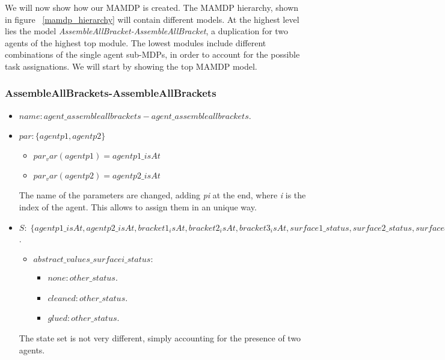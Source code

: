 We will now show how our MAMDP is created. The MAMDP hierarchy, shown in figure ~\ref{mamdp_hierarchy} will contain different models. At the highest level lies the model \textit{AssembleAllBracket-AssembleAllBracket}, a duplication for two agents of the highest top module. The lowest modules include different combinations of the single agent sub-MDPs, in order to account for the possible task assignations. We will start by showing the top MAMDP model.

\subsubsection{AssembleAllBrackets-AssembleAllBrackets}
\begin{itemize}
	\item $name: agent\_assembleallbrackets-agent\_assembleallbrackets$.
	\item		$par: \{agentp1,agentp2\}$
		\begin{itemize}
			\item $par_var(agentp1)=agentp1\_isAt$
			\item $par_var(agentp2)=agentp2\_isAt$
		\end{itemize}

		The name of the parameters are changed, adding \textit{pi} at the end, where \textit{i} is the index of the agent. This allows to assign them in an unique way.
	\item $S:\;\{agentp1\_isAt,agentp2\_isAt, bracket1_isAt,bracket2_isAt,bracket3_isAt,surface1\_status,surface2\_status,surface3\_status\}$. 
		\begin{itemize}
			\item $values(agentp1\_isAt):\{table,surface1,surface2,surface3\}$.
			\item $values(agentp2\_isAt):\{table,surface1,surface2,surface3\}$.
			\item $values(bracketi\_isAt):\{table,surface1,surface2,surface3,agentp1,agentp2} \forall_{i=1}^3$. 
			\item $values(surfacei\_status):\{completed,other\_status\}\;\forall_{i=1}^3$.
		\end{itemize}
		\begin{itemize}
			\item $abstract\_values\_surfacei\_status:$ 
				\begin{itemize}
					\item $none: other\_status$.
					\item $cleaned: other\_status$.
					\item $glued: other\_status$.
				\end{itemize}
		\end{itemize}
		The state set is not very different, simply accounting for the presence of two agents.


\end{itemize}
